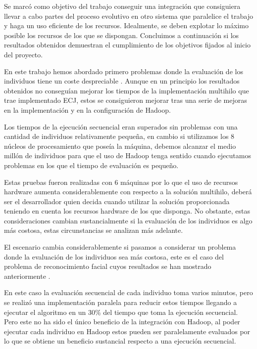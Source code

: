 Se marc\'o como objetivo del trabajo conseguir una integraci\'on que consiguiera llevar a cabo partes del proceso evolutivo en otro sistema que paralelice el trabajo y haga un uso eficiente de los recursos. Idealmente, se deben explotar lo m\'aximo posible los recursos de los que se dispongan. Concluimos a continuaci\'on si los resultados obtenidos demuestran el cumplimiento de los objetivos fijados al inicio del proyecto.

En este trabajo hemos abordado primero problemas donde la evaluaci\'on de los individuos tiene un coste despreciable . Aunque en un principio los resultados obtenidos no consegu\'ian mejorar los tiempos de la implementaci\'on multihilo que trae implementado ECJ, estos se consiguieron mejorar tras una serie de mejoras en la implementaci\'on y en la configuraci\'on de Hadoop.

Los tiempos de la ejecuci\'on secuencial eran superados sin problemas con una cantidad de individuos relativamente peque\~na, en cambio si utilizamos los 8 núcleos de procesamiento que poseía la m\'aquina, debemos alcanzar el medio mill\'on de individuos para que el uso de Hadoop tenga sentido cuando ejecutamos problemas en los que el tiempo de evaluaci\'on es peque\~no. 

Estas pruebas fueron realizadas con 6 m\'aquinas por lo que el uso de recursos hardware aumenta considerablemente con respecto a la soluci\'on multihilo, deber\'a ser el desarrollador quien decida cuando utilizar la soluci\'on proporcionada teniendo en cuenta los recursos hardware de los que disponga. No obstante, estas consideraciones cambian sustancialmente si la evaluaci\'on de los individuos es algo m\'as costosa, estas circunstancias se analizan m\'as adelante.


El escenario cambia considerablemente si pasamos a considerar un problema donde la evaluaci\'on de los individuos sea m\'as costosa, este es el caso del problema de reconocimiento facial cuyos resultados se han mostrado anteriormente . 

En este caso la evaluaci\'on secuencial de cada individuo toma varios minutos, pero se realiz\'o una implementaci\'on paralela para reducir estos tiempos llegando a ejecutar el algoritmo en un 30\% del tiempo que toma la ejecuci\'on secuencial. Pero este no ha sido el \'unico beneficio de la integraci\'on con Hadoop, al poder ejecutar cada individuo en Hadoop estos pueden ser paralelamente evaluados por lo que se obtiene un beneficio sustancial respecto a una ejecuci\'on secuencial. 

